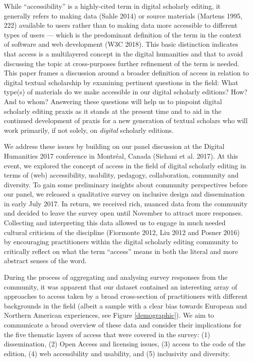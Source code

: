 \begin{paper}
While ``accessibility'' is a highly-cited term in digital scholarly
editing, it generally refers to making data (Sahle 2014) or source
materials (Martens 1995, 222) available to users rather than to making
data more accessible to different types of users --- which is the
predominant definition of the term in the context of software and web
development (W3C 2018). This basic distinction indicates that access is
a multilayered concept in the digital humanities and that to avoid
discussing the topic at cross-purposes further refinement of the term is
needed. This paper frames a discussion around a broader definition of
access in relation to digital textual scholarship by examining pertinent
questions in the field: What type(s) of materials do we make accessible
in our digital scholarly editions? How? And to whom? Answering these
questions will help us to pinpoint digital scholarly editing praxis as
it stands at the present time and to aid in the continued development of
praxis for a new generation of textual scholars who will work primarily,
if not solely, on \emph{digital} scholarly editions.

We address these issues by building on our panel
discussion at the Digital Humanities 2017 conference in Montréal, Canada
(Sichani et al. 2017). At this event, we explored the concept of access
in the field of digital scholarly editing in terms of (web)
accessibility, usability, pedagogy, collaboration, community and
diversity. To gain some preliminary insights about community
perspectives before our panel, we released a qualitative survey on
inclusive \mbox{design} and dissemination in early July 2017. In return, we
received rich, nuanced data from the community and decided to leave the
survey open until November to attract more responses. Collecting and
interpreting this data allowed us to engage in much needed cultural
criticism of the discipline (Fiormonte 2012, Liu 2012 and Posner 2016)
by encouraging practitioners within the digital scholarly editing
community to critically reflect on what the term ``access'' means in
both the literal and more abstract senses of the word.

During the process of aggregating and analysing survey responses from
the community, it was apparent that our dataset contained an interesting
array of approaches to access taken by a broad cross-section of
practitioners with different backgrounds in the field (albeit a sample
with a clear bias towards European and Northern American experiences, see Figure \ref{demographic}).
We aim to communicate a broad overview of these data and consider their
implications for the five thematic layers of access that were covered in
the survey: (1) dissemination, (2) Open Access and licensing issues, (3)
access to the code of the edition, (4) web accessibility and usability,
and (5) inclusivity and diversity.


\end{paper}
